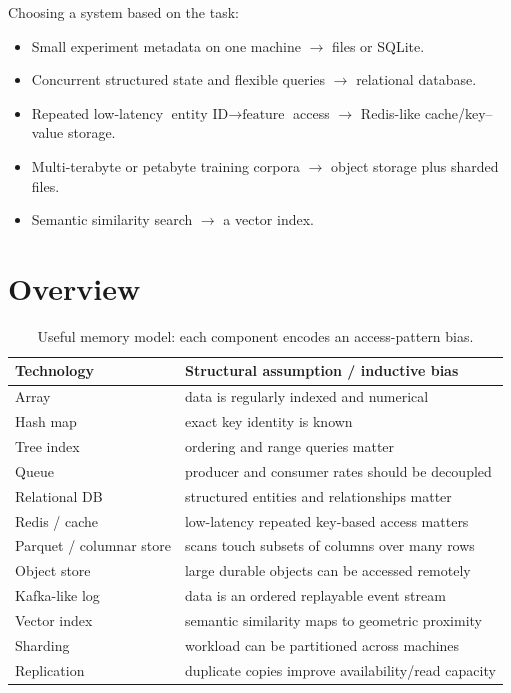Choosing a system based on the task:
\begin{itemize}
    \item Small experiment metadata on one machine \(\rightarrow\) files or SQLite.
    \item Concurrent structured state and flexible queries \(\rightarrow\) relational database.
    \item Repeated low-latency \(\text{entity ID}\rightarrow\text{feature}\) access \(\rightarrow\) Redis-like cache/key--value storage.
    \item Multi-terabyte or petabyte training corpora \(\rightarrow\) object storage plus sharded files.
    \item Semantic similarity search \(\rightarrow\) a vector index.
\end{itemize}

\section{Overview}
\label{sec:data-systems-evolution}
\label{sec:inductive-bias-data-systems}

\begin{table}[htbp]
\centering
\caption{Useful memory model: each component encodes an access-pattern bias.}
\label{tab:inductive-bias-data-systems}
\begin{tabularx}{\linewidth}{@{}lX@{}}
\toprule
\textbf{Technology} & \textbf{Structural assumption / inductive bias} \\
\midrule
Array & data is regularly indexed and numerical \\
Hash map & exact key identity is known \\
Tree index & ordering and range queries matter \\
Queue & producer and consumer rates should be decoupled \\
Relational DB & structured entities and relationships matter \\
Redis / cache & low-latency repeated key-based access matters \\
Parquet / columnar store & scans touch subsets of columns over many rows \\
Object store & large durable objects can be accessed remotely \\
Kafka-like log & data is an ordered replayable event stream \\
Vector index & semantic similarity maps to geometric proximity \\
Sharding & workload can be partitioned across machines \\
Replication & duplicate copies improve availability/read capacity \\
\bottomrule
\end{tabularx}
\end{table}


